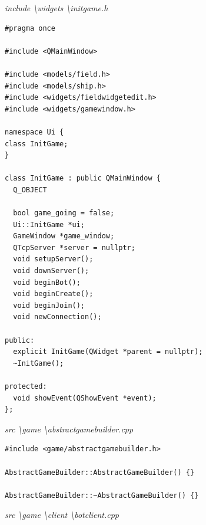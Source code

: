 \documentclass[a4paper,14pt]{extarticle}
\begin{document}
\textit{include \textbackslash widgets \textbackslash initgame.h}
\begin{verbatim}
#pragma once

#include <QMainWindow>

#include <models/field.h>
#include <models/ship.h>
#include <widgets/fieldwidgetedit.h>
#include <widgets/gamewindow.h>

namespace Ui {
class InitGame;
}

class InitGame : public QMainWindow {
  Q_OBJECT

  bool game_going = false;
  Ui::InitGame *ui;
  GameWindow *game_window;
  QTcpServer *server = nullptr;
  void setupServer();
  void downServer();
  void beginBot();
  void beginCreate();
  void beginJoin();
  void newConnection();

public:
  explicit InitGame(QWidget *parent = nullptr);
  ~InitGame();

protected:
  void showEvent(QShowEvent *event);
};

\end{verbatim}
\textit{src \textbackslash game \textbackslash abstractgamebuilder.cpp}
\begin{verbatim}
#include <game/abstractgamebuilder.h>

AbstractGameBuilder::AbstractGameBuilder() {}

AbstractGameBuilder::~AbstractGameBuilder() {}

\end{verbatim}
\textit{src \textbackslash game \textbackslash client \textbackslash botclient.cpp}
\end{document}
